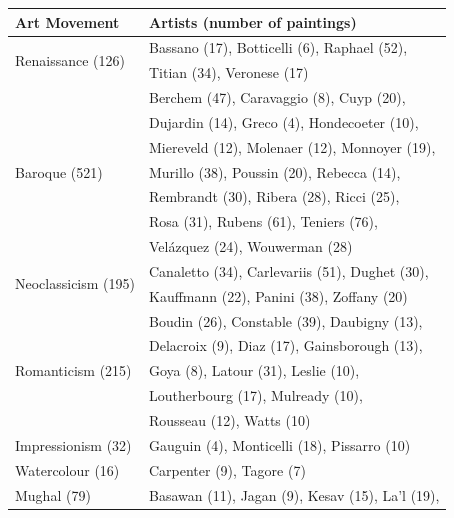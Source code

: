 \documentclass[11pt,a4paper,draft]{report}
\begin{document}
\begin{multicols}{2}
\begin{table}[htp]  %
\centering
\begin{tabular}{|l|l|}
\toprule
Art Movement & Artists (number of paintings) \\
\bottomrule \toprule
\multirow{2}{*}{Renaissance (126)}
                     &  Bassano (17), Botticelli (6), Raphael (52), \\
                     &  Titian (34), Veronese (17)                  \\
\midrule
\multirow{7}{*}{Baroque (521)}
                     &  Berchem (47), Caravaggio (8), Cuyp (20),      \\
                     &  Dujardin (14), Greco (4), Hondecoeter (10),   \\
                     &  Miereveld (12), Molenaer (12), Monnoyer (19), \\
                     &  Murillo (38), Poussin (20), Rebecca (14),     \\
                     &  Rembrandt (30), Ribera (28), Ricci (25),      \\
                     &  Rosa (31), Rubens (61), Teniers (76),         \\
                     &  Vel\'azquez (24), Wouwerman (28)              \\
\midrule
\multirow{2}{*}{Neoclassicism (195)}
                     &  Canaletto (34), Carlevariis (51), Dughet (30), \\
                     &  Kauffmann (22), Panini (38), Zoffany (20)      \\
\midrule
\multirow{5}{*}{Romanticism (215)}
                     &  Boudin (26), Constable (39), Daubigny (13),  \\
                     &  Delacroix (9), Diaz (17), Gainsborough (13), \\
                     &  Goya (8), Latour (31), Leslie (10),          \\
                     &  Loutherbourg (17), Mulready (10),            \\
                     &  Rousseau (12),  Watts (10)                   \\
\midrule
Impressionism (32)   &  Gauguin (4), Monticelli (18), Pissarro (10) \\
\bottomrule \toprule
Watercolour (16)     &  Carpenter (9), Tagore (7) \\
\midrule
\multirow{2}{*}{Mughal (79)}
                     &  Basawan (11), Jagan (9), Kesav (15), La'l (19), \\

\end{tabular}
\end{table}
\end{multicols}
\end{document}
